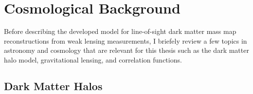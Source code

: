 \documentclass[%
 reprint,
 amsmath,amssymb,
 aps,nofootinbib
]{revtex4-1}
\begin{document}


\section{Cosmological Background}

Before describing the developed model for line-of-sight dark matter mass map reconstructions from weak lensing measurements, I briefely review a few topics in astronomy and cosmology that are relevant for this thesis such as the dark matter halo model, gravitational lensing, and correlation functions.

\subsection{Dark Matter Halos}
\end{document}
